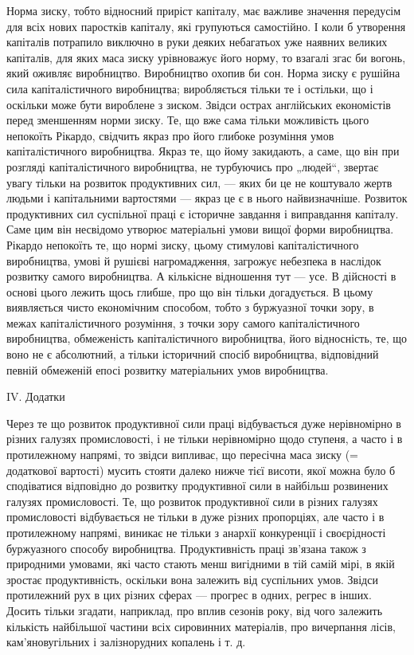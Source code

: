 Норма зиску, тобто відносний приріст капіталу, має важливе
значення передусім для всіх нових паростків капіталу, які групуються
самостійно. І коли б утворення капіталів потрапило
виключно в руки деяких небагатьох уже наявних великих
капіталів, для яких маса зиску урівноважує його норму, то
взагалі згас би вогонь, який оживляє виробництво. Виробництво
охопив би сон. Норма зиску є рушійна сила капіталістичного
виробництва; виробляється тільки те і остільки, що і оскільки
може бути вироблене з зиском. Звідси острах англійських економістів
перед зменшенням норми зиску. Те, що вже сама тільки
можливість цього непокоїть Рікардо, свідчить якраз про його
глибоке розуміння умов капіталістичного виробництва. Якраз те,
що йому закидають, а саме, що він при розгляді капіталістичного
виробництва, не турбуючись про „людей“, звертає увагу
тільки на розвиток продуктивних сил, — яких би це не коштувало
жертв людьми і капітальними вартостями — якраз це є
в нього найвизначніше. Розвиток продуктивних сил суспільної
праці є історичне завдання і виправдання капіталу. Саме цим він
несвідомо утворює матеріальні умови вищої форми виробництва.
Рікардо непокоїть те, що нормі зиску, цьому стимулові капіталістичного
виробництва, умові й рушієві нагромадження, загрожує
небезпека в наслідок розвитку самого виробництва. А кількісне
відношення тут — усе. В дійсності в основі цього лежить щось
глибше, про що він тільки догадується. В цьому виявляється
чисто економічним способом, тобто з буржуазної точки зору,
в межах капіталістичного розуміння, з точки зору самого капіталістичного
виробництва, обмеженість капіталістичного виробництва,
його відносність, те, що воно не є абсолютний, а тільки
історичний спосіб виробництва, відповідний певній обмеженій
епосі розвитку матеріальних умов виробництва.

IV. Додатки

Через те що розвиток продуктивної сили праці відбувається
дуже нерівномірно в різних галузях промисловості, і не тільки
нерівномірно щодо ступеня, а часто і в протилежному напрямі,
то звідси випливає, що пересічна маса зиску (= додаткової
вартості) мусить стояти далеко нижче тієї висоти, якої можна
було б сподіватися відповідно до розвитку продуктивної сили
в найбільш розвинених галузях промисловості. Те, що розвиток
продуктивної сили в різних галузях промисловості відбувається
не тільки в дуже різних пропорціях, але часто і в протилежному
напрямі, виникає не тільки з анархії конкуренції і своєрідності
буржуазного способу виробництва. Продуктивність праці
зв’язана також з природними умовами, які часто стають менш
вигідними в тій самій мірі, в якій зростає продуктивність, оскільки
вона залежить від суспільних умов. Звідси протилежний рух
в цих різних сферах — прогрес в одних, регрес в інших. Досить
тільки згадати, наприклад, про вплив сезонів року, від чого
залежить кількість найбільшої частини всіх сировинних матеріалів,
про вичерпання лісів, кам’яновугільних і залізнорудних
копалень і т. д.

